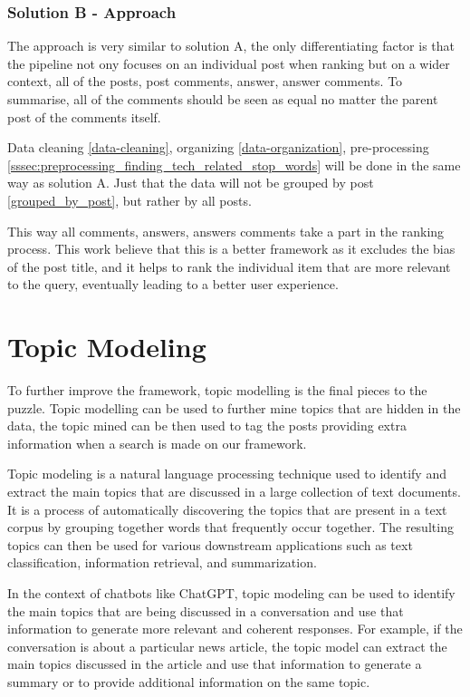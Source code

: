 \subsubsection{Solution B - Approach}
The approach is very similar to solution A, the only differentiating factor is that the pipeline not ony focuses on an individual post when ranking but on a wider context, all of the posts, post comments, answer, answer comments. To summarise, all of the comments should be seen as equal no matter the parent post of the comments itself. 

Data cleaning \ref{data-cleaning}, organizing \ref*{data-organization}, pre-processing \ref*{sssec:preprocessing_finding_tech_related_stop_words} will be done in the same way as solution A.  Just that the data will not be grouped by post \ref*{grouped_by_post}, but rather by all posts. 

This way all comments, answers, answers comments take a part in the ranking process. This work believe that this is a better framework as it excludes the bias of the post title, and it helps to rank the individual item that are more relevant to the query, eventually leading to a better user experience.

\section{Topic Modeling}
To further improve the framework, topic modelling is the final pieces to the puzzle. Topic modelling can be used to further mine topics that are hidden in the data, the topic mined can be then used to tag the posts providing extra information when a search is made on our framework.

Topic modeling is a natural language processing technique used to identify and extract the main topics that are discussed in a large collection of text documents. It is a process of automatically discovering the topics that are present in a text corpus by grouping together words that frequently occur together. The resulting topics can then be used for various downstream applications such as text classification, information retrieval, and summarization.

In the context of chatbots like ChatGPT, topic modeling can be used to identify the main topics that are being discussed in a conversation and use that information to generate more relevant and coherent responses. For example, if the conversation is about a particular news article, the topic model can extract the main topics discussed in the article and use that information to generate a summary or to provide additional information on the same topic.

